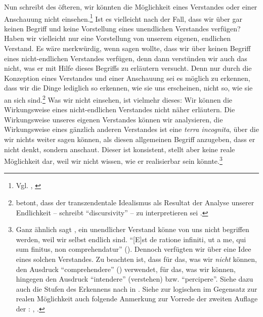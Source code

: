 Nun schreibt  des öfteren, wir könnten die Möglichkeit
eines  Verstandes oder einer 
Anschauung nicht einsehen.\footnote{Vgl. \cite[][B
213]{Kant:KritikderreinenVernunft2003}, \cite[][III:
212.20--21]{Kant:GesammelteWerke1900ff.}} Ist es vielleicht nach
 der Fall, dass wir
über gar keinen Begriff und keine Vorstellung eines unendlichen Verstandes
verfügen? Haben wir vielleicht nur eine Vorstellung von unserem eigenen,
endlichen Verstand. Es wäre merkwürdig, wenn  sagen wollte,
dass wir über keinen Begriff eines nicht-endlichen Verstandes verfügen, denn
dann verstünden wir auch das nicht, was er mit Hilfe dieses Begriffs zu
erläutern versucht.  Denn nur durch die Konzeption eines
 Verstandes und einer  Anschauung sei
es möglich zu erkennen, dass wir die Dinge lediglich so erkennen, wie sie uns
erscheinen, nicht so, wie sie an sich sind.\footnote{ betont,
dass der transzendentale Idealismus als Resultat der Analyse unserer
Endlichkeit --  schreibt
\enquote{discursivity} -- zu interpretieren sei
\parencite[vgl.][1--73]{Allison:KantsTranscendentalIdealism2004}.} Was wir nicht einsehen, ist vielmehr dieses: Wir
können die Wirkungsweise eines nicht-endlichen Verstandes
nicht näher erläutern. Die Wirkungsweise unseres eigenen Verstandes können wir analysieren,
die Wirkungsweise eines gänzlich anderen Verstandes ist eine \emph{terra
incognita}, über die wir nichts weiter sagen können, als diesen allgemeinen Begriff anzugeben,
dass er nicht denkt, sondern anschaut. Dieser ist konsistent, stellt
aber keine reale Möglichkeit dar, weil wir nicht wissen, wie er realisierbar
sein könnte.\footnote{Ganz ähnlich sagt
, ein unendlicher
Verstand könne von uns nicht begriffen werden, weil wir selbst endlich sind.
\enquote{[E]st {\punkt} de ratione infiniti, ut a me, qui sum finitus, non
comprehendatur} \mkbibparens{\cite[][VII:
46.21--23]{Descartes:OeuvresdeDescartes1983}}.
Dennoch verfügten wir über eine Idee eines solchen Verstandes.
Zu beachten ist, dass  für das, was wir
\emph{nicht} können, den Ausdruck \enquote{comprehendere}
() verwendet, für das, was wir können, hingegen den
Ausdruck \enquote{intendere} (verstehen) bzw. \enquote{percipere}. Siehe dazu
auch die Stufen des Erkennens nach  in \cite[][A
96\,f.,]{Kant:ImmanuelKantsLogik1977} \cite[][IX:
64.33--65.24]{Kant:GesammelteWerke1900ff.}. Siehe zur logischen im Gegensatz
zur realen Möglichkeit auch folgende Anmerkung zur Vorrede der zweiten Auflage
der : \cite[][B
xxvi]{Kant:KritikderreinenVernunft2003},
\cite[][III: 17.29--38]{Kant:GesammelteWerke1900ff.}.}


